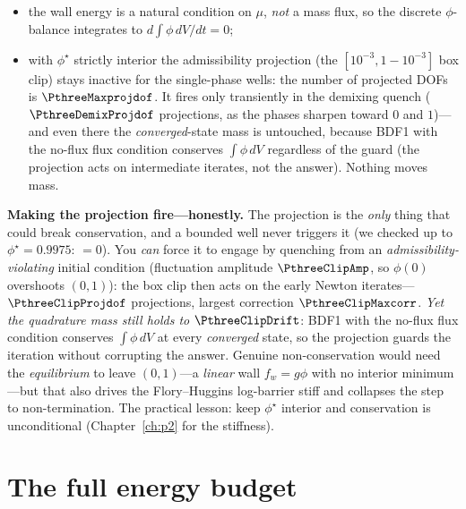 \begin{itemize}[nosep]
  \item the wall energy is a natural condition on $\mu$, \emph{not} a
        mass flux, so the discrete $\phi$-balance integrates to
        $d\!\int\phi\,dV/dt=0$;
  \item with $\phi^\star$ strictly interior the admissibility projection
        (the $[10^{-3},1-10^{-3}]$ box clip) stays inactive for the
        single-phase wells: the number of projected DOFs is
        $\PthreeMaxprojdof$. It fires only transiently in the demixing
        quench ($\PthreeDemixProjdof$ projections, as the phases sharpen
        toward $0$ and $1$)---and even there the \emph{converged}-state
        mass is untouched, because BDF1 with the no-flux flux condition
        conserves $\int\phi\,dV$ regardless of the guard (the projection
        acts on intermediate iterates, not the answer). Nothing moves mass.
\end{itemize}

\begin{keybox}
\textbf{Making the projection fire---honestly.} The projection is the
\emph{only} thing that could break conservation, and a bounded well never
triggers it (we checked up to $\phi^\star=0.9975$:
$=0$). You \emph{can} force it to engage by quenching
from an \emph{admissibility-violating} initial condition (fluctuation
amplitude $\PthreeClipAmp$, so $\phi(0)$ overshoots $(0,1)$): the box clip
then acts on the early Newton iterates---$\PthreeClipProjdof$ projections,
largest correction $\PthreeClipMaxcorr$. \emph{Yet the quadrature mass
still holds to $\PthreeClipDrift$}: BDF1 with the no-flux flux condition
conserves $\int\phi\,dV$ at every \emph{converged} state, so the projection
guards the iteration without corrupting the answer. Genuine
non-conservation would need the \emph{equilibrium} to leave $(0,1)$---a
\emph{linear} wall $f_w=g\phi$ with no interior minimum---but that also
drives the Flory--Huggins log-barrier stiff and collapses the step to
non-termination. The practical lesson: keep $\phi^\star$ interior and
conservation is unconditional (Chapter~\ref{ch:p2} for the stiffness).
\end{keybox}

\section{The full energy budget}

